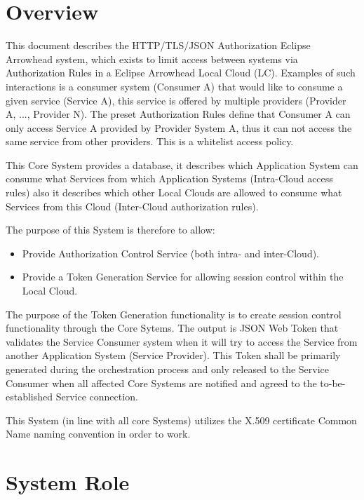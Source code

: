 \documentclass[a4paper]{arrowhead}
\begin{document}
\section{Overview}
\label{sec:overview}

This document describes the HTTP/TLS/JSON Authorization Eclipse Arrowhead system, which exists to limit access between systems via Authorization Rules in a Eclipse Arrowhead Local Cloud (LC). 
Examples of such interactions is a consumer system (Consumer A) that would like to consume a given service (Service A), this service is offered by multiple providers (Provider A, ..., Provider N). The preset Authorization Rules define that Consumer A can only access Service A provided by Provider System A, thus it can not access the same service from other providers. This is a whitelist access policy.

This Core System provides a database, it describes which Application System can consume what Services from which Application Systems (Intra-Cloud access rules) also it describes which other Local Clouds are allowed to consume what Services from this Cloud (Inter-Cloud authorization rules).

The purpose of this System is therefore to allow:
\begin{itemize}

\item Provide Authorization Control Service (both intra- and inter-Cloud).
\item Provide a Token Generation Service for allowing session control within the Local Cloud.
\end{itemize}

The purpose of the Token Generation functionality is to create session control functionality through the Core Sytems. The output is JSON Web Token that validates the Service Consumer system when it will try to access the Service from another Application System (Service Provider). This Token shall be primarily generated during the orchestration process and only released to the Service Consumer when all affected Core Systems are notified and agreed to the to-be-established Service connection.

This System (in line with all core Systems) utilizes the X.509 certificate Common Name naming convention in order to work.


\section{System Role}
\label{sec:role}
\end{document}

